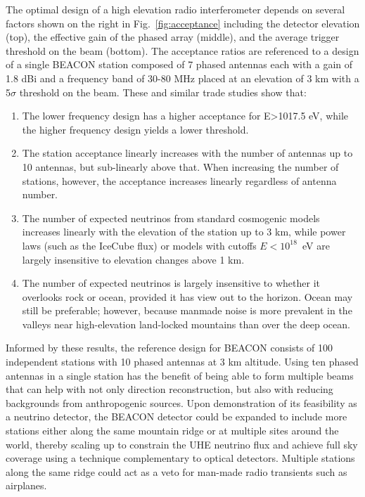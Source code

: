 \documentclass[12pt]{article}
\begin{document}
The optimal design of a high elevation radio interferometer depends on several factors shown on the right in Fig.~\ref{fig:acceptance} including the detector elevation (top), the effective gain of the phased array (middle), and the average trigger threshold on the beam (bottom). The acceptance ratios are referenced to a design of a single BEACON station composed of 7 phased antennas each with a gain of 1.8 dBi and a frequency band of 30-80 MHz placed at an elevation of 3 km with a 5$\sigma$ threshold on the beam. These and similar trade studies show that:
\begin{enumerate}
\item	The lower frequency design has a higher acceptance for E>1017.5 eV, while the higher frequency design yields a lower threshold.
\item The station acceptance linearly increases with the number of antennas up to 10 antennas, but sub-linearly above that. When increasing the number of stations, however, the acceptance increases linearly regardless of antenna number.
\item The number of expected neutrinos from standard cosmogenic models increases linearly with the elevation of the station up to 3 km, while power laws (such as the IceCube flux) or models with cutoffs $E<10^{18}$~eV are largely insensitive to elevation changes above 1 km. 
\item The number of expected neutrinos is largely insensitive to whether it overlooks rock or ocean, provided it has view out to the horizon. Ocean may still be preferable; however, because manmade noise is more prevalent in the valleys near high-elevation land-locked mountains than over the deep ocean.
\end{enumerate}

Informed by these results, the reference design for BEACON consists of 100 independent stations with 10 phased antennas at 3 km altitude. Using ten phased antennas in a single station has the benefit of being able to form multiple beams that can help with not only direction reconstruction, but also with reducing backgrounds from anthropogenic sources. Upon demonstration of its feasibility as a neutrino detector, the BEACON detector could be expanded to include  more stations either along the same mountain ridge or at multiple sites around the world, thereby scaling up to constrain the UHE neutrino flux and achieve full sky coverage using a technique complementary to optical detectors. Multiple stations along the same ridge could act as a veto for man-made radio transients such as airplanes. 
\end{document}
